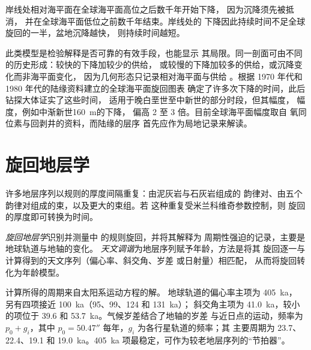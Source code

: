 \begin{omfigure}
\par{}\label{fig:b3:sequence-stratigraphy:section}
\end{omfigure}


岸线处相对海平面在全球海平面高位之后数千年开始下降，
因为沉降须先被抵消，
并在全球海平面低位之前数千年结束。岸线处的
下降因此持续时间不足全球旋回的一半，盆地沉降越快，
则持续时间越短。

此类模型是检验解释是否可靠的有效手段，也能显示
其局限。同一剖面可由不同的历史形成：较快的下降加较少的供给，
或较慢的下降加较多的供给，或沉降变化而非海平面变化，
因为几何形态只记录相对海平面与供给
。根据 1970 年代和 1980 年代的陆缘资料建立的全球海平面旋回图表
确定了许多次下降的时间，此后钻探大体证实了这些时间，
适用于晚白垩世至中新世的部分时段，但其幅度，
幅度，例如中渐新世\qty{160}{m}的下降，
偏高 2 至 3 倍。目前全球海平面幅度取自
氧同位素与回剥井的资料，而陆缘的层序
首先应作为局地记录来解读。

\section{旋回地层学}\label{sec:b3:sequence-stratigraphy:cyclo}

许多地层序列以规则的厚度间隔重复：由泥灰岩与石灰岩组成的
韵律对、由五个韵律对组成的束，以及更大的束组。若
这种重复受米兰科维奇参数控制，则
旋回的厚度即可转换为时间。

\begin{definition}[旋回地层学与天文调谐]\label{def:b3:sequence-stratigraphy:cyclo}
\emph{旋回地层学}识别并测量中
的规则旋回，并将其解释为
周期性强迫的记录，主要是地球轨道与地轴的变化。
\emph{天文调谐}为地层序列赋予年龄，方法是将其
旋回逐一与计算得到的天文序列（偏心率、斜交角、岁差
或日射量）相匹配，
从而将旋回转化为年龄模型。
\end{definition}

计算所得的周期来自太阳系运动方程的解。
地球轨道的偏心率主项为 \qty{405}{ka}，
另有四项接近 \qty{100}{ka}（95、99、124 和 \qty{131}{ka}）；
斜交角主项为 \qty{41.0}{ka}，较小的项位于 39.6 和
\qty{53.7}{ka}。气候岁差结合了地轴的岁差
与近日点的运动，频率为 $p_0 + g_i$，其中 $p_0 =
50.47''$ 每年，$g_i$ 为各行星轨道的频率；其
主要周期为 23.7、22.4、19.1 和 \qty{19.0}{ka}。\qty{405}{ka}
项最稳定，可作为较老地层序列的“节拍器”。

